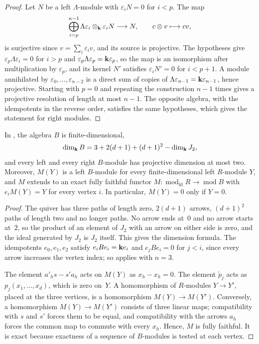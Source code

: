 \begin{proof}
  Let $N$ be a left $\Lambda$-module with ${\varepsilon_iN=0}$ for ${i<p}$. The map
  \[
    \bigoplus_{i=p}^{n-1}\Lambda\varepsilon_i\otimes_{\mathbf{k}}\varepsilon_iN
    \longrightarrow N,\qquad c\otimes v\longmapsto cv,
  \]
  is surjective since ${v=\sum_i\varepsilon_iv}$, and its source is projective.
  The hypotheses give ${\varepsilon_p\Lambda\varepsilon_i=0}$ for ${i>p}$ and
  ${\varepsilon_p\Lambda\varepsilon_p=\mathbf{k}\varepsilon_p}$, so the map is an
  isomorphism after multiplication by $\varepsilon_p$, and its kernel $N'$
  satisfies ${\varepsilon_iN'=0}$ for ${i<p+1}$. A module annihilated by
  $\varepsilon_0,\dots,\varepsilon_{n-2}$ is a direct sum of copies of
  ${\Lambda\varepsilon_{n-1}=\mathbf{k}\varepsilon_{n-1}}$, hence projective. Starting
  with ${p=0}$ and repeating the construction ${n-1}$ times gives a projective
  resolution of length at most ${n-1}$. The opposite algebra, with the
  idempotents in the reverse order, satisfies the same hypotheses, which gives
  the statement for right modules.
\end{proof}

\begin{proposition}
  \label{prop:encoding-algebra}
  In , the algebra $B$ is finite-dimensional,
  \[
    \dim_{\mathbf{k}} B=3+2(d+1)+(d+1)^2-\dim_{\mathbf{k}} J_2,
  \]
  and every left and every right $B$-module has projective dimension at most
  two. Moreover, $M(Y)$ is a left $B$-module for every finite-dimensional left
  $R$-module $Y$, and $M$ extends to an exact fully faithful functor
  ${M\colon\operatorname{mod}_{\mathrm{fd}}R\to\operatorname{mod}B}$ with
  ${e_iM(Y)=Y}$ for every vertex $i$. In particular, ${M(Y)=0}$ only if ${Y=0}$.
\end{proposition}

\begin{proof}
  The quiver has three paths of length zero, ${2(d+1)}$ arrows, ${(d+1)^2}$ paths
  of length two and no longer paths. No arrow ends at~$0$ and no arrow starts
  at~$2$, so the product of an element of $J_2$ with an arrow on either side is
  zero, and the ideal generated by $J_2$ is $J_2$ itself. This gives the
  dimension formula. The idempotents $e_0,e_1,e_2$ satisfy
  ${e_iBe_i=\mathbf{k} e_i}$ and ${e_jBe_i=0}$ for ${j<i}$, since every arrow increases the
  vertex index; so  applies with ${n=3}$.

  The element ${a'_hs-s'a_h}$ acts on $M(Y)$ as ${x_h-x_h=0}$. The element
  $\widetilde{p}_j$ acts as $p_j(x_1,\dots,x_d)$, which is zero on~$Y$. A
  homomorphism of $R$-modules ${Y\to Y'}$, placed at the three vertices, is a
  homomorphism ${M(Y)\to M(Y')}$. Conversely, a homomorphism ${M(Y)\to M(Y')}$
  consists of three linear maps; compatibility with $s$ and $s'$ forces them
  to be equal, and compatibility with the arrows $a_h$ forces the common map
  to commute with every $x_h$. Hence, $M$ is fully faithful. It is exact
  because exactness of a sequence of $B$-modules is tested at each vertex.
\end{proof}

